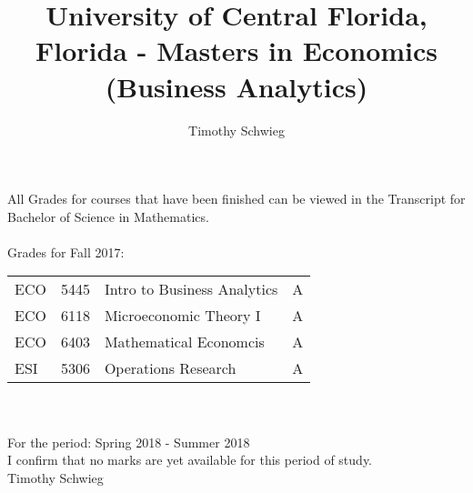 \documentclass[10pt, letterpaper]{paper}
\author{Timothy Schwieg}
\date{}
\title{University of Central Florida, Florida - Masters in Economics (Business Analytics)}
\begin{document}
\maketitle
All Grades for courses that have been finished can be viewed in the
Transcript for Bachelor of Science in Mathematics. \\ \\

Grades for Fall 2017:
\begin{center}
\begin{tabular}{lrll}
ECO & 5445 & Intro to Business Analytics & A\\
ECO & 6118 & Microeconomic Theory I & A\\
ECO & 6403 & Mathematical Economcis & A\\
ESI & 5306 & Operations Research & A\\
\end{tabular}
\end{center}

\\ \\
For the period: Spring 2018 - Summer 2018 \\

I confirm that no marks are yet available for this period of study. \\

Timothy Schwieg
\end{document}
